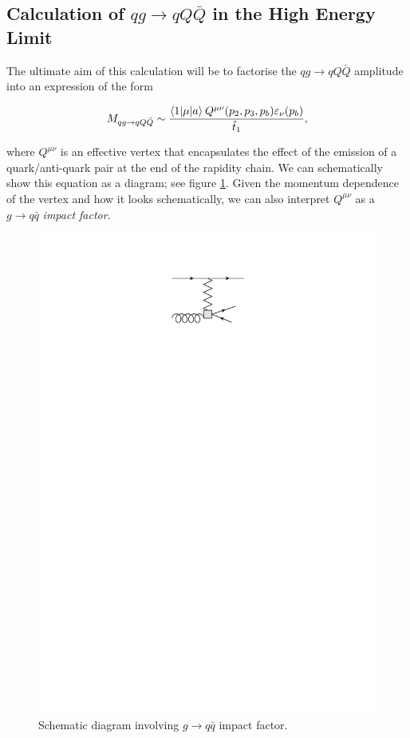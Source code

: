 \subsection{Calculation of $qg \to qQ\bar{Q}$ in the High Energy Limit}

The ultimate aim of this calculation will be to factorise the $qg \to qQ\bar{Q}$ amplitude into an expression of the form

\begin{equation}
M_{qg \to qQ\bar{Q}} \sim \frac{\mathinner{\langle1\vert\mu\vert a\rangle}_{}Q^{\mu \nu}(p_2, p_3, p_b) \varepsilon_\nu(p_b)}{\hat{t}_1},
\label{eqn:NLLeqn}
\end{equation}

where $Q^{\mu \nu}$ is an effective vertex that encapsulates the effect of the emission of a quark/anti-quark pair at the end of the rapidity chain. We can schematically show this equation as a diagram; see figure \ref{fig:qgimp}. Given the momentum dependence of the vertex and how it looks schematically, we can also interpret $Q^{\mu \nu}$ as a $g \to q \bar{q}$ \emph{impact factor}.

\begin{figure}[t]
\centering
\includegraphics{Images/g_q_qbar_imp.pdf}
\caption{Schematic diagram involving $g \to q \bar{q}$ impact factor.}
\label{fig:qgimp}
\end{figure}


